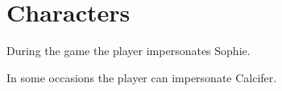 \chapter{Characters}

During the game the player impersonates Sophie.

In some occasions the player can impersonate Calcifer.


%

















